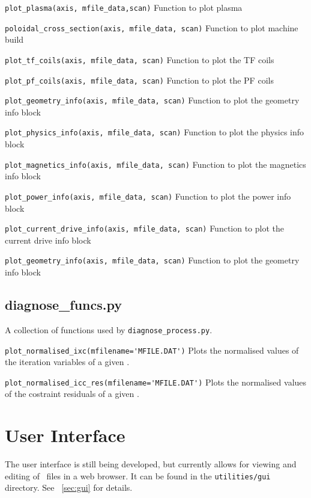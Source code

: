 \begin{description}

\item{\verb|plot_plasma(axis, mfile_data,scan)|} Function to plot plasma

\item{\verb|poloidal_cross_section(axis, mfile_data, scan)|} Function to plot machine build

\item{\verb|plot_tf_coils(axis, mfile_data, scan)|} Function to plot the TF coils

\item{\verb|plot_pf_coils(axis, mfile_data, scan)|} Function to plot the PF coils

\item{\verb|plot_geometry_info(axis, mfile_data, scan)|} Function to plot the
  geometry info block

\item{\verb|plot_physics_info(axis, mfile_data, scan)|} Function to plot the
  physics info block

\item{\verb|plot_magnetics_info(axis, mfile_data, scan)|} Function to plot the
  magnetics info block

\item{\verb|plot_power_info(axis, mfile_data, scan)|} Function to plot the
  power info block

\item{\verb|plot_current_drive_info(axis, mfile_data, scan)|} Function to plot
  the current drive info block

\item{\verb|plot_geometry_info(axis, mfile_data, scan)|} Function to plot the
  geometry info block

\end{description}


\subsection{diagnose\_funcs.py}

A collection of functions used by \texttt{diagnose\_process.py}.

\begin{description}

\item{\verb|plot_normalised_ixc(mfilename='MFILE.DAT')|} Plots the normalised values of the iteration variables of a given \mfile.

\item{\verb|plot_normalised_icc_res(mfilename='MFILE.DAT')|} Plots the normalised values of the costraint residuals of a given \mfile.

\end{description}


\section{User Interface}

The user interface is still being developed, but currently allows for viewing
and editing of \indat\ files in a web browser. It can be found in the
\texttt{utilities/gui} directory.  See ~\ref{sec:gui} for details.
